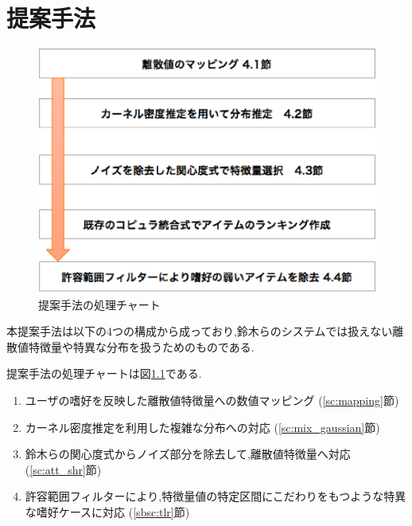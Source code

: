 \chapter{提案手法}
\label{ch:proposal}
\begin{figure}[H]
  \begin{center}
    \includegraphics[width=5in]{source/proposal.eps}
  \vspace{1mm}
  \caption{提案手法の処理チャート} %
  \label{fig:proposal}
  \end{center} 
\end{figure}
\hspace{1em}本提案手法は以下の4つの構成から成っており,鈴木らのシステムでは扱えない離散値特徴量や特異な分布を扱うためのものである.\par
提案手法の処理チャートは図\ref{fig:proposal}である.
\begin{enumerate} 
  \item ユーザの嗜好を反映した離散値特徴量への数値マッピング (\ref{sc:mapping}節)
  \item カーネル密度推定を利用した複雑な分布への対応 (\ref{sc:mix_gaussian}節)
  \item 鈴木らの関心度式からノイズ部分を除去して,離散値特徴量へ対応 (\ref{sc:att_shr}節)
  \item 許容範囲フィルターにより,特徴量値の特定区間にこだわりをもつような特異な嗜好ケースに対応 (\ref{sbsc:tlr}節)
\end{enumerate}

